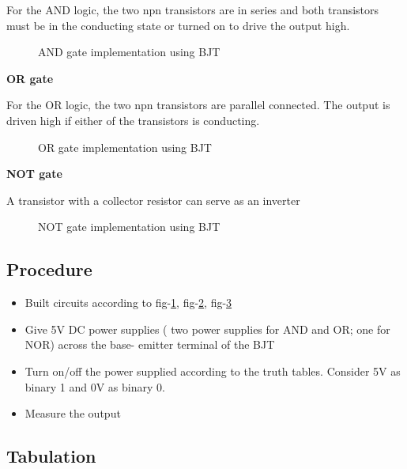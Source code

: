 \noindent For the AND logic, the two npn transistors are in series and both transistors must be in the conducting state or turned on to drive the output high.

\begin{figure}[H]
    \centering
    
    \caption{AND gate implementation using BJT}
    \label{fig:and_gate}
\end{figure}

\vspace{0.25cm}

\noindent \textbf{OR gate}

\noindent For the OR logic, the two npn transistors are parallel connected. The output is driven high if either of the transistors is conducting.

\begin{figure}[H]
    \centering
    
    \caption{OR gate implementation using BJT}
    \label{fig:or_gate}
\end{figure}

\vspace{0.25cm}

\noindent \textbf{NOT gate}

\noindent A transistor with a collector resistor can serve as an inverter

\begin{figure}[H]
    \centering
    
    \caption{NOT gate implementation using BJT}
    \label{fig:not_gate}
\end{figure}

\subsection*{Procedure}
\begin{itemize}
    \item Built circuits according to fig-\ref{fig:and_gate}, fig-\ref{fig:or_gate}, fig-\ref{fig:not_gate}
    \item Give 5V DC power supplies ( two power supplies for AND and OR; one for NOR) across the base- emitter terminal of the BJT
    \item Turn on/off the power supplied according to the truth tables. Consider 5V as binary 1 and 0V as binary 0.
    \item Measure the output
\end{itemize}

\subsection*{Tabulation}


